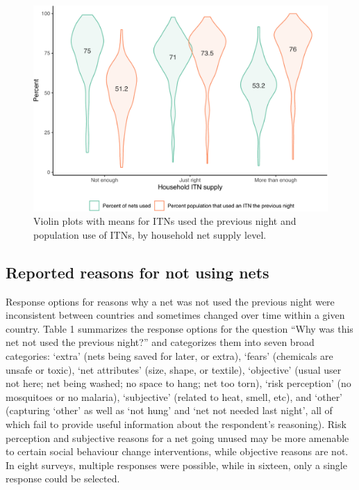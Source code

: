 \documentclass[review,
3p]{elsarticle} %
\begin{document}
\begin{figure}

{\centering \includegraphics[width=0.8\linewidth]{reasons_paper_files/figure-latex/fig_violin-1} 

}

\caption{\label{fig_violin}Violin plots with means for ITNs used the previous night and population use of ITNs, by household net supply level.}\label{fig:fig_violin}
\end{figure}

\hypertarget{reported-reasons-for-not-using-nets}{%
\subsection{Reported reasons for not using
nets}\label{reported-reasons-for-not-using-nets}}

Response options for reasons why a net was not used the previous night
were inconsistent between countries and sometimes changed over time
within a given country. Table 1 summarizes the response options for the
question ``Why was this net not used the previous night?'' and
categorizes them into seven broad categories: `extra' (nets being saved
for later, or extra), `fears' (chemicals are unsafe or toxic), `net
attributes' (size, shape, or textile), `objective' (usual user not here;
net being washed; no space to hang; net too torn), `risk perception' (no
mosquitoes or no malaria), `subjective' (related to heat, smell, etc),
and `other' (capturing `other' as well as `not hung' and `net not needed
last night', all of which fail to provide useful information about the
respondent's reasoning). Risk perception and subjective reasons for a
net going unused may be more amenable to certain social behaviour change
interventions, while objective reasons are not. In eight surveys,
multiple responses were possible, while in sixteen, only a single
response could be selected.
\end{document}
